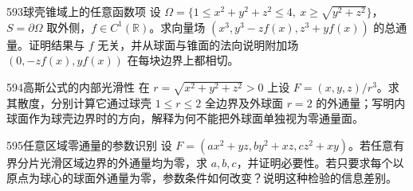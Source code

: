 \begin{exercise}{593}{球壳锥域上的任意函数项}
设 $\Omega=\{1\le x^2+y^2+z^2\le4,\ x\ge\sqrt{y^2+z^2}\}$，$S=\partial\Omega$ 取外侧，$f\in C^1(\mathbb R)$。求向量场 $(x^3,y^3-zf(x),z^3+yf(x))$ 的总通量。证明结果与 $f$ 无关，并从球面与锥面的法向说明附加场 $(0,-zf(x),yf(x))$ 在每块边界上都相切。
\end{exercise}
\begin{exercise}{594}{高斯公式的内部光滑性}
在 $r=\sqrt{x^2+y^2+z^2}>0$ 上设 $F=(x,y,z)/r^3$。求其散度，分别计算它通过球壳 $1\le r\le2$ 全边界及外球面 $r=2$ 的外通量；写明内球面作为球壳边界时的方向，解释为何不能把外球面单独视为零通量面。
\end{exercise}
\begin{exercise}{595}{任意区域零通量的参数识别}
设 $F=(ax^2+yz,by^2+xz,cz^2+xy)$。若任意有界分片光滑区域边界的外通量均为零，求 $a,b,c$，并证明必要性。若只要求每个以原点为球心的球面外通量为零，参数条件如何改变？说明这种检验的信息差别。
\end{exercise}
